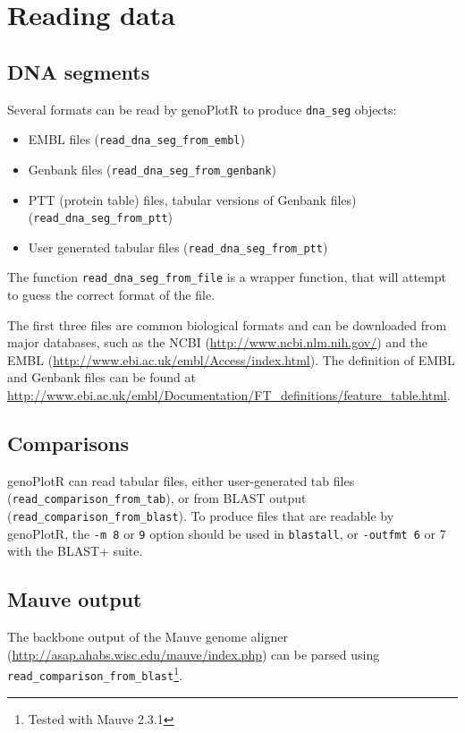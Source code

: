 \documentclass[a4paper]{article}
\newcommand{\code}[1]{\texttt{#1}}
\newcommand{\pkg}[1]{{\normalfont\fontseries{b}\selectfont #1}}
\newcommand{\genoPlotR}{\pkg{genoPlotR}}
\begin{document}
\section{Reading data}

\subsection{DNA segments}

Several formats can be read by \genoPlotR{} to produce \code{dna\_seg} objects:
\begin{itemize}
  \item EMBL files (\code{read\_dna\_seg\_from\_embl})
  \item Genbank files (\code{read\_dna\_seg\_from\_genbank})
  \item PTT (protein table) files, tabular versions of Genbank 
    files)(\code{read\_dna\_seg\_from\_ptt})
  \item User generated tabular files (\code{read\_dna\_seg\_from\_ptt})
\end{itemize}
The function \code{read\_dna\_seg\_from\_file} is a wrapper function, that
will attempt to guess the correct format of the file.

The first three files are common biological formats and can be downloaded 
from major databases, such as the NCBI (\url{http://www.ncbi.nlm.nih.gov/}) 
and the EMBL (\url{http://www.ebi.ac.uk/embl/Access/index.html}). The 
definition of EMBL and Genbank files can be found at 
\url{http://www.ebi.ac.uk/embl/Documentation/FT_definitions/feature_table.html}.

\subsection{Comparisons}

\genoPlotR{} can read tabular files, either user-generated tab files 
(\code{read\_comparison\_from\_tab}), or from BLAST output
(\code{read\_comparison\_from\_blast}). To produce files that are readable by 
\genoPlotR{}, the \code{-m 8} or \code{9} option should be used in 
\code{blastall}, or \code{-outfmt 6} or {7} with the BLAST+ suite.

\subsection{Mauve output}

The backbone output of the Mauve genome aligner 
(\url{http://asap.ahabs.wisc.edu/mauve/index.php}) can be parsed using 
\code{read\_comparison\_from\_blast}\footnote{Tested with Mauve 2.3.1}.
\end{document}

